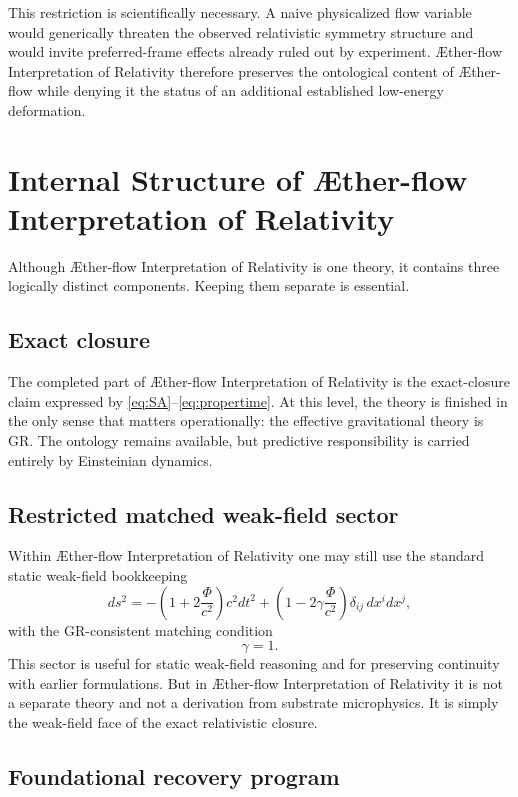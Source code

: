 \documentclass[11pt]{article}
\newcommand{\Aflow}{\AE{}ther-flow}
\newcommand{\TheoryName}{\Aflow{} Interpretation of Relativity}
\newcommand{\Ph}{\Phi}
\begin{document}
This restriction is scientifically necessary. A naive physicalized flow variable would generically threaten the observed relativistic symmetry structure and would invite preferred-frame effects already ruled out by experiment. \TheoryName{} therefore preserves the ontological content of \Aflow{} while denying it the status of an additional established low-energy deformation.

\section{Internal Structure of \TheoryName{}}

Although \TheoryName{} is one theory, it contains three logically distinct components. Keeping them separate is essential.

\subsection{Exact closure}

The completed part of \TheoryName{} is the exact-closure claim expressed by \eqref{eq:SA}--\eqref{eq:propertime}. At this level, the theory is finished in the only sense that matters operationally: the effective gravitational theory is GR. The ontology remains available, but predictive responsibility is carried entirely by Einsteinian dynamics.

\subsection{Restricted matched weak-field sector}

Within \TheoryName{} one may still use the standard static weak-field bookkeeping
\begin{equation}
ds^2
=
-\left(1+2\frac{\Ph}{c^2}\right)c^2dt^2
+
\left(1-2\gamma\frac{\Ph}{c^2}\right)\delta_{ij}\,dx^i dx^j,
\label{eq:weakfield}
\end{equation}
with the GR-consistent matching condition
\begin{equation}
\gamma = 1.
\label{eq:gamma}
\end{equation}
This sector is useful for static weak-field reasoning and for preserving continuity with earlier formulations. But in \TheoryName{} it is not a separate theory and not a derivation from substrate microphysics. It is simply the weak-field face of the exact relativistic closure.

\subsection{Foundational recovery program}
\end{document}
